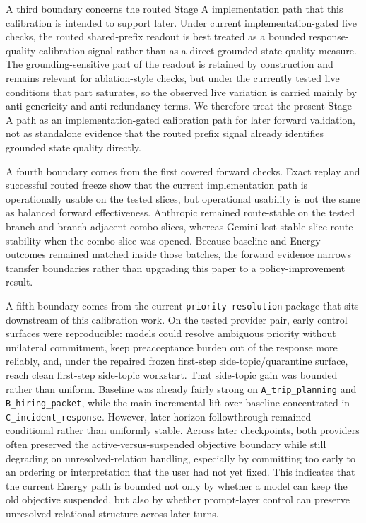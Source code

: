 \documentclass[11pt,a4paper]{article}
\begin{document}
A third boundary concerns the routed Stage A implementation path that this calibration is intended to support later. Under current implementation-gated live checks, the routed shared-prefix readout is best treated as a bounded response-quality calibration signal rather than as a direct grounded-state-quality measure. The grounding-sensitive part of the readout is retained by construction and remains relevant for ablation-style checks, but under the currently tested live conditions that part saturates, so the observed live variation is carried mainly by anti-genericity and anti-redundancy terms. We therefore treat the present Stage A path as an implementation-gated calibration path for later forward validation, not as standalone evidence that the routed prefix signal already identifies grounded state quality directly.

A fourth boundary comes from the first covered forward checks. Exact replay and successful routed freeze show that the current implementation path is operationally usable on the tested slices, but operational usability is not the same as balanced forward effectiveness. Anthropic remained route-stable on the tested branch and branch-adjacent combo slices, whereas Gemini lost stable-slice route stability when the combo slice was opened. Because baseline and Energy outcomes remained matched inside those batches, the forward evidence narrows transfer boundaries rather than upgrading this paper to a policy-improvement result.

A fifth boundary comes from the current \texttt{priority-resolution} package that sits downstream of this calibration work. On the tested provider pair, early control surfaces were reproducible: models could resolve ambiguous priority without unilateral commitment, keep preacceptance burden out of the response more reliably, and, under the repaired frozen first-step side-topic/quarantine surface, reach clean first-step side-topic workstart. That side-topic gain was bounded rather than uniform. Baseline was already fairly strong on \texttt{A\_trip\_planning} and \texttt{B\_hiring\_packet}, while the main incremental lift over baseline concentrated in \texttt{C\_incident\_response}. However, later-horizon followthrough remained conditional rather than uniformly stable. Across later checkpoints, both providers often preserved the active-versus-suspended objective boundary while still degrading on unresolved-relation handling, especially by committing too early to an ordering or interpretation that the user had not yet fixed. This indicates that the current Energy path is bounded not only by whether a model can keep the old objective suspended, but also by whether prompt-layer control can preserve unresolved relational structure across later turns.
\end{document}
